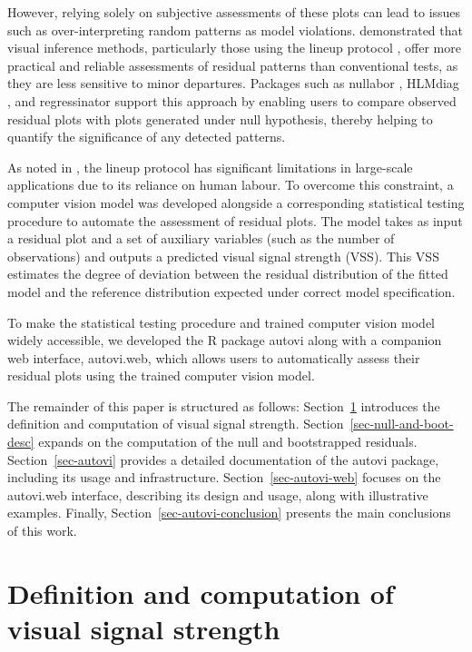 \documentclass[
doublespace,
  times]{anzsauth}
\begin{document}
However, relying solely on subjective assessments of these plots can
lead to issues such as over-interpreting random patterns as model
violations. \citet{li2024plot} demonstrated that visual inference
methods, particularly those using the lineup protocol
\citep{buja2009statistical}, offer more practical and reliable
assessments of residual patterns than conventional tests, as they are
less sensitive to minor departures. Packages such as \textsf{nullabor}
\citep{nullabor}, \textsf{HLMdiag} \citep{loy2014hlmdiag}, and
\textsf{regressinator} \citep{regressinator} support this approach by
enabling users to compare observed residual plots with plots generated
under null hypothesis, thereby helping to quantify the significance of
any detected patterns.

As noted in \citet{li2024automated}, the lineup protocol has significant
limitations in large-scale applications due to its reliance on human
labour. To overcome this constraint, a computer vision model was
developed alongside a corresponding statistical testing procedure to
automate the assessment of residual plots. The model takes as input a
residual plot and a set of auxiliary variables (such as the number of
observations) and outputs a predicted visual signal strength (VSS). This
VSS estimates the degree of deviation between the residual distribution
of the fitted model and the reference distribution expected under
correct model specification.

To make the statistical testing procedure and trained computer vision
model widely accessible, we developed the \textsf{R} package
\textsf{autovi} along with a companion web interface,
\textsf{autovi.web}, which allows users to automatically assess their
residual plots using the trained computer vision model.

The remainder of this paper is structured as follows:
Section~\ref{sec-vss-desc} introduces the definition and computation of
visual signal strength. Section~\ref{sec-null-and-boot-desc} expands on
the computation of the null and bootstrapped residuals.
Section~\ref{sec-autovi} provides a detailed documentation of the
\textsf{autovi} package, including its usage and infrastructure.
Section~\ref{sec-autovi-web} focuses on the \textsf{autovi.web}
interface, describing its design and usage, along with illustrative
examples. Finally, Section~\ref{sec-autovi-conclusion} presents the main
conclusions of this work.

\section{Definition and computation of visual signal
strength}\label{sec-vss-desc}
\end{document}

